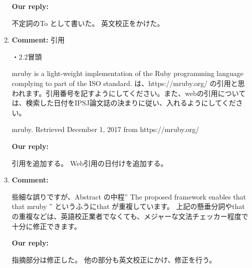 \documentclass{article}
\begin{document}
\begin{enumerate}
\begin{flushleft}
\textbf{Our reply:}

不定詞のTo として書いた。
英文校正をかけた。
\end{flushleft}

\item \begin{flushleft}
\textbf{Comment:} 引用

・2.2冒頭

mruby is a light-weight implementation of the Ruby programming language complying to part of the ISO standard.
は、https://mruby.org/
の引用と思われます。引用番号を記すようにしてください。また、webの引用については、検索した日付をIPSJ論文誌の決まりに従い、入れるようにしてください。

mruby. Retrieved December 1, 2017 from https://mruby.org/
\end{flushleft}

\begin{flushleft}
\textbf{Our reply:}

引用を追加する。
Web引用の日付けを追加する。
\end{flushleft}

\item \begin{flushleft}
\textbf{Comment:} 

些細な誤りですが、Abstract の中程” The proposed framework enables that that mruby ” というふうにthat が重複しています。
上記の懸垂分詞やthatの重複などは、英語校正業者でなくても、メジャーな文法チェッカー程度で十分に修正できます。

\end{flushleft}

\begin{flushleft}
\textbf{Our reply:}

指摘部分は修正した。
他の部分も英文校正にかけ、修正を行う。
\end{flushleft}

\end{enumerate}
\end{document}
